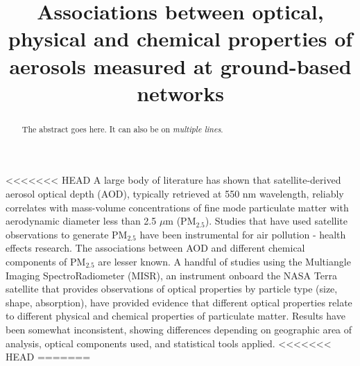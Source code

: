 \documentclass[, manuscript]{copernicus}
\begin{document}
\title{Associations between optical, physical and chemical properties of
aerosols measured at ground-based networks}














\received{}
\pubdiscuss{} %
\revised{}
\accepted{}
\published{}




\maketitle


\begin{abstract}
The abstract goes here. It can also be on \emph{multiple lines}.
\end{abstract}




\introduction

\textless{}\textless{}\textless{}\textless{}\textless{}\textless{}\textless{}
HEAD A large body of literature has shown that satellite-derived aerosol
optical depth (AOD), typically retrieved at 550 nm wavelength, reliably
correlates with mass-volume concentrations of fine mode particulate
matter with aerodynamic diameter less than 2.5 \(\mu\)m (PM\(_{2.5}\)).
Studies that have used satellite observations to generate PM\(_{2.5}\)
have been instrumental for air pollution - health effects research. The
associations between AOD and different chemical components of
PM\(_{2.5}\) are lesser known. A handful of studies using the Multiangle
Imaging SpectroRadiometer (MISR), an instrument onboard the NASA Terra
satellite that provides observations of optical properties by particle
type (size, shape, absorption), have provided evidence that different
optical properties relate to different physical and chemical properties
of particulate matter. Results have been somewhat inconsistent, showing
differences depending on geographic area of analysis, optical components
used, and statistical tools applied.
<<<<<<< HEAD
=======
\end{document}
